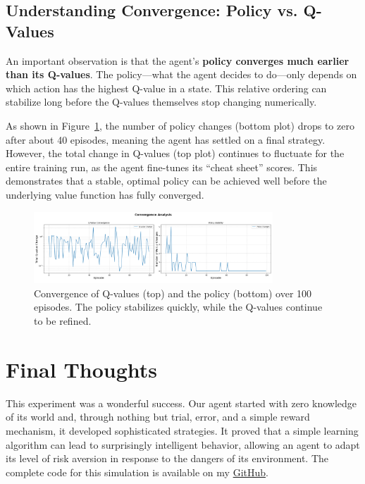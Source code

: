 \documentclass[11pt, a4paper]{article}
\begin{document}
\subsection{Understanding Convergence: Policy vs. Q-Values}
An important observation is that the agent's \textbf{policy converges much earlier than its Q-values}. The policy—what the agent decides to do—only depends on which action has the highest Q-value in a state. This relative ordering can stabilize long before the Q-values themselves stop changing numerically.

As shown in Figure~\ref{fig:convergence}, the number of policy changes (bottom plot) drops to zero after about 40 episodes, meaning the agent has settled on a final strategy. However, the total change in Q-values (top plot) continues to fluctuate for the entire training run, as the agent fine-tunes its ``cheat sheet'' scores. This demonstrates that a stable, optimal policy can be achieved well before the underlying value function has fully converged.

\begin{figure}[H]
    \centering
    \includegraphics[width=0.8\textwidth]{images/convergence.png}
    \caption{Convergence of Q-values (top) and the policy (bottom) over 100 episodes. The policy stabilizes quickly, while the Q-values continue to be refined.}\label{fig:convergence}
\end{figure}



\section{Final Thoughts}
This experiment was a wonderful success. Our agent started with zero knowledge of its world and, through nothing but trial, error, and a simple reward mechanism, it developed sophisticated strategies. It proved that a simple learning algorithm can lead to surprisingly intelligent behavior, allowing an agent to adapt its level of risk aversion in response to the dangers of its environment. The complete code for this simulation is available on my \href{https://github.com/Jeevan-HM/RL-in-Robotics.git}{GitHub}.
\end{document}
